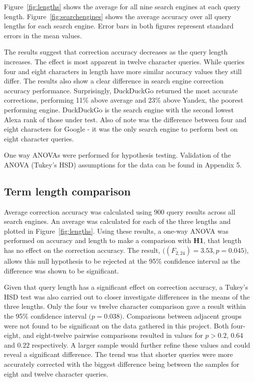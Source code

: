 \documentclass{csfourzero}
\begin{document}
Figure~\ref{fig:lengths} shows the average for all nine search engines at each query length. Figure~\ref{fig:searchengines} shows the average accuracy over all query lengths for each search engine. Error bars in both figures represent standard errors in the mean values.

The results suggest that correction accuracy decreases as the query length increases. The effect is most apparent in twelve character queries. While queries four and eight characters in length have more similar accuracy values they still differ. The results also show a clear difference in search engine correction accuracy performance. Surprisingly, DuckDuckGo returned the most accurate corrections, performing 11\% above average and 23\% above Yandex, the poorest performing engine. DuckDuckGo is the search engine with the second lowest Alexa rank of those under test. Also of note was the difference between four and eight characters for Google - it was the only search engine to perform best on eight character queries.

One way ANOVAs were performed for hypothesis testing. Validation of the ANOVA (Tukey's HSD) assumptions for the data can be found in Appendix 5.

\subsection{Term length comparison}
Average correction accuracy was calculated using 900 query results across all search engines. An average was calculated for each of the three lengths and plotted in Figure~\ref{fig:lengths}. Using these results, a one-way ANOVA was performed on accuracy and length to make a comparison with \textbf{H1}, that length has no effect on the correction accuracy. The result, $\big((F_{2,24}) = 3.53, p = 0.045\big)$, allows this null hypothesis to be rejected at the 95\% confidence interval as the difference was shown to be significant.

Given that query length has a significant effect on correction accuracy, a Tukey's HSD test was also carried out to closer investigate differences in the means of the three lengths. Only the four vs twelve character comparison gave a result within the 95\% confidence interval $\big(p = 0.038\big)$. Comparisons between adjacent groups were not found to be significant on the data gathered in this project. Both four-eight, and eight-twelve pairwise comparisons resulted in values for $p > 0.2$, $0.64$ and $0.22$ respectively. A larger sample would further refine these values and could reveal a significant difference. The trend was that shorter queries were more accurately corrected with the biggest difference being between the samples for eight and twelve character queries.
\end{document}

